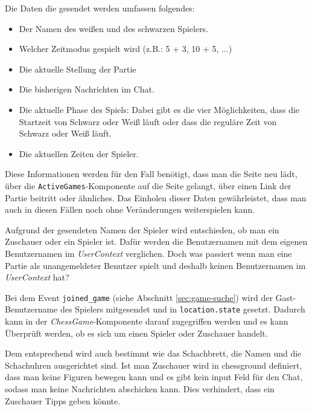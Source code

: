 Die Daten die gesendet werden umfassen folgendes:
\begin{itemize}
\item Der Namen des weißen und des schwarzen Spielers.
\item Welcher Zeitmodus gespielt wird (z.B.: 5 + 3, 10 + 5, ...)
\item Die aktuelle Stellung der Partie
\item Die bisherigen Nachrichten im Chat.
\item Die aktuelle Phase des Spiels: Dabei gibt es die vier Möglichkeiten, dass die Startzeit von Schwarz oder Weiß läuft oder dass die reguläre Zeit von Schwarz oder Weiß läuft.
\item Die aktuellen Zeiten der Spieler.
\end{itemize}
Diese Informationen werden für den Fall benötigt, dass man die Seite neu lädt, über die \verb|ActiveGames|-Komponente auf die Seite gelangt, über einen Link der Partie beitritt oder ähnliches. Das Einholen dieser Daten gewährleistet, dass man auch in diesen Fällen noch ohne Veränderungen weiterspielen kann.

Aufgrund der gesendeten Namen der Spieler wird entschieden, ob man ein Zuschauer oder ein Spieler ist.  Dafür werden die Benutzernamen mit dem eigenen Benutzernamen im \textit{UserContext} verglichen. Doch was passiert wenn man eine Partie als unangemeldeter Benutzer spielt und deshalb keinen Benutzernamen im \textit{UserContext} hat?

Bei dem Event \verb|joined_game| (siehe Abschnitt \ref{sec:game-suche}) wird der Gast-Benutzername des Spielers mitgesendet und in \verb|location.state| gesetzt. Dadurch kann in der \textit{ChessGame}-Komponente darauf zugegriffen werden und es kann Überprüft werden, ob es sich um einen Spieler oder Zuschauer handelt.


Dem entsprechend wird auch bestimmt wie das Schachbrett, die Namen und die Schachuhren ausgerichtet sind. Ist man Zuschauer wird in chessground definiert, dass man keine Figuren bewegen kann und es gibt kein input Feld für den Chat, sodass man keine Nachrichten abschicken kann. Dies verhindert, dass ein Zuschauer Tipps geben könnte.

